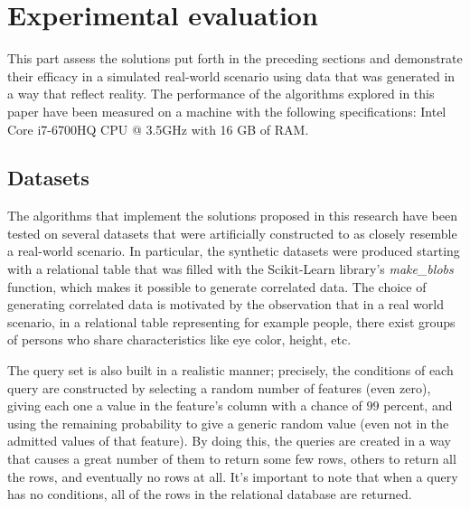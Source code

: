 \section{Experimental evaluation} 
\label{experimental_evalutation}
This part assess the solutions put forth in the preceding sections and demonstrate their efficacy in a simulated real-world scenario using data that was generated in a way that reflect reality. The performance of the algorithms explored in this paper have been measured on a machine with the following  specifications: Intel Core i7-6700HQ CPU @ 3.5GHz with 16 GB of RAM.


\subsection{Datasets}
The algorithms that implement the solutions proposed in this research have been tested on several datasets that were artificially constructed to as closely resemble a real-world scenario.
In particular, the synthetic datasets were produced starting with a relational table that was filled with the Scikit-Learn library's \emph{make\_blobs} function, which makes it possible to generate correlated data. The choice of generating correlated data is motivated by the observation that in a real world scenario, in a relational table representing for example people, there exist groups of persons who share characteristics like eye color, height, etc. 

The query set is also built in a realistic manner; precisely, the conditions of each query are constructed by selecting a random number of features (even zero), giving each one a value in the feature's column with a chance of $99$ percent, and using the remaining probability to give a generic random value (even not in the admitted values of that feature). By doing this, the queries are created in a way that causes a great number of them to return some few rows, others to return all the rows, and eventually no rows at all. It's important to note that when a query has no conditions, all of the rows in the relational database are returned. 

